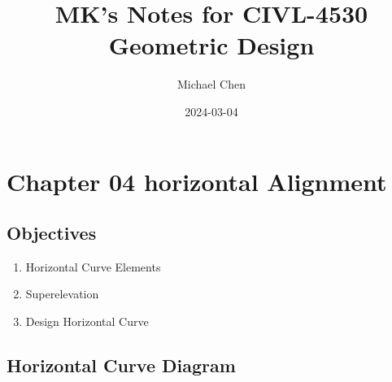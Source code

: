 \documentclass{article}
\title{MK's Notes for CIVL-4530 Geometric Design}
\date{2024-03-04}
\author{Michael Chen}
\begin{document}
  \setcounter{page}{40}


  \tableofcontents
  \newpage


  \setcounter{section}{3}
  \section{Chapter 04 horizontal Alignment}
  \subsection{Objectives}
  \begin{enumerate}
    \item Horizontal Curve Elements
    \item Superelevation
    \item Design Horizontal Curve
  \end{enumerate}

  \subsection{Horizontal Curve Diagram}
  
\end{document}
